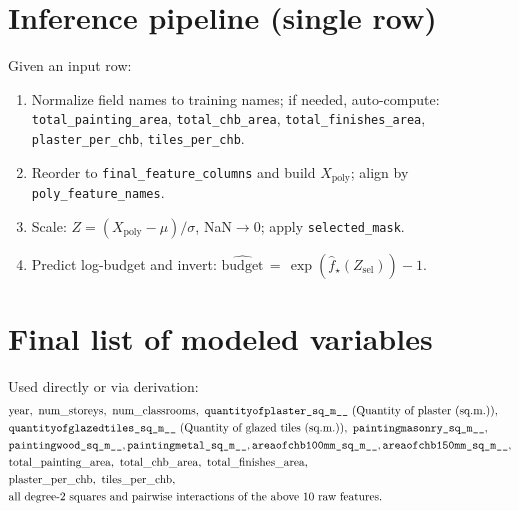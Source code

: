 \documentclass[11pt]{article}
\begin{document}
\section*{Inference pipeline (single row)}
Given an input row:
\begin{enumerate}
  \item Normalize field names to training names; if needed, auto-compute: \texttt{total\_painting\_area}, \texttt{total\_chb\_area}, \texttt{total\_finishes\_area}, \texttt{plaster\_per\_chb}, \texttt{tiles\_per\_chb}.
  \item Reorder to \texttt{final\_feature\_columns} and build $X_{\text{poly}}$; align by \texttt{poly\_feature\_names}.
  \item Scale: $Z = (X_{\text{poly}}-\mu)/\sigma$, NaN$\rightarrow$0; apply \texttt{selected\_mask}.
  \item Predict log-budget and invert: $\widehat{\mathrm{budget}} \,=\, \exp(\hat{f}_{\star}(Z_{\text{sel}})) - 1$.
\end{enumerate}

\section*{Final list of modeled variables}
Used directly or via derivation:
\[
\begin{aligned}
&\text{year},\ \text{num\_storeys},\ \text{num\_classrooms},\ \verb|quantityofplaster_sq_m__|~(\text{Quantity of plaster (sq.m.)}),\\
&\verb|quantityofglazedtiles_sq_m__|~(\text{Quantity of glazed tiles (sq.m.)}),\ \verb|paintingmasonry_sq_m__|,\\
&\verb|paintingwood_sq_m__|, \verb|paintingmetal_sq_m__|, \verb|areaofchb100mm_sq_m__|, \verb|areaofchb150mm_sq_m__|,\\
&\text{total\_painting\_area},\ \text{total\_chb\_area},\ \text{total\_finishes\_area},\\
&\text{plaster\_per\_chb},\ \text{tiles\_per\_chb},\\
&\text{all degree-2 squares and pairwise interactions of the above 10 raw features.}
\end{aligned}
\]
\end{document}
